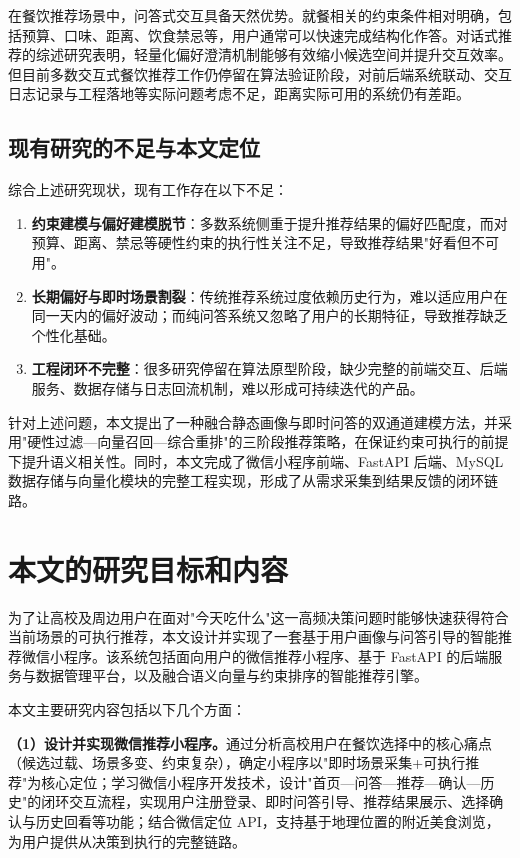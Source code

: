 在餐饮推荐场景中，问答式交互具备天然优势。就餐相关的约束条件相对明确，包括预算、口味、距离、饮食禁忌等，用户通常可以快速完成结构化作答。对话式推荐的综述研究表明，轻量化偏好澄清机制能够有效缩小候选空间并提升交互效率\super{[15]}。但目前多数交互式餐饮推荐工作仍停留在算法验证阶段，对前后端系统联动、交互日志记录与工程落地等实际问题考虑不足，距离实际可用的系统仍有差距。

\subsection{现有研究的不足与本文定位}

综合上述研究现状，现有工作存在以下不足：

\begin{enumerate}[label=\arabic*., leftmargin=2em, itemsep=0.2em]
    \item \textbf{约束建模与偏好建模脱节}：多数系统侧重于提升推荐结果的偏好匹配度，而对预算、距离、禁忌等硬性约束的执行性关注不足，导致推荐结果"好看但不可用"。
    \item \textbf{长期偏好与即时场景割裂}：传统推荐系统过度依赖历史行为，难以适应用户在同一天内的偏好波动；而纯问答系统又忽略了用户的长期特征，导致推荐缺乏个性化基础。
    \item \textbf{工程闭环不完整}：很多研究停留在算法原型阶段，缺少完整的前端交互、后端服务、数据存储与日志回流机制，难以形成可持续迭代的产品。
\end{enumerate}

针对上述问题，本文提出了一种融合静态画像与即时问答的双通道建模方法，并采用"硬性过滤---向量召回---综合重排"的三阶段推荐策略，在保证约束可执行的前提下提升语义相关性。同时，本文完成了微信小程序前端、FastAPI 后端、MySQL 数据存储与向量化模块的完整工程实现，形成了从需求采集到结果反馈的闭环链路。

\section{本文的研究目标和内容}

为了让高校及周边用户在面对"今天吃什么"这一高频决策问题时能够快速获得符合当前场景的可执行推荐，本文设计并实现了一套基于用户画像与问答引导的智能推荐微信小程序。该系统包括面向用户的微信推荐小程序、基于 FastAPI 的后端服务与数据管理平台，以及融合语义向量与约束排序的智能推荐引擎。

本文主要研究内容包括以下几个方面：

\textbf{（1）设计并实现微信推荐小程序。}通过分析高校用户在餐饮选择中的核心痛点（候选过载、场景多变、约束复杂），确定小程序以"即时场景采集+可执行推荐"为核心定位；学习微信小程序开发技术，设计"首页---问答---推荐---确认---历史"的闭环交互流程，实现用户注册登录、即时问答引导、推荐结果展示、选择确认与历史回看等功能；结合微信定位 API，支持基于地理位置的附近美食浏览，为用户提供从决策到执行的完整链路。

